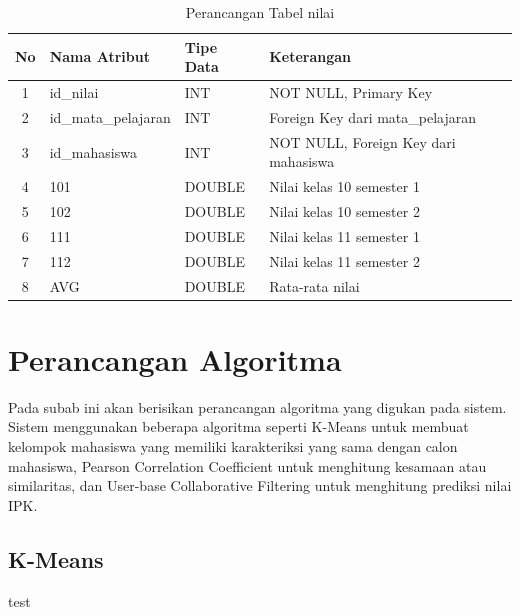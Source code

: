 \begin{enumerate}
        \begin{table}[H]
            \centering
            \begin{tabular}{|c|p{4cm}|p{4cm}|p{4cm}|}
                \hline
                No & Nama Atribut & Tipe Data & Keterangan \\
                \hline
                1 & id\_nilai & INT & NOT NULL, Primary Key \\
                \hline
                2 & id\_mata\_pelajaran & INT & Foreign Key dari mata\_pelajaran \\
                \hline
                3 & id\_mahasiswa & INT & NOT NULL, Foreign Key dari mahasiswa \\
                \hline
                4 & 101 & DOUBLE & Nilai kelas 10 semester 1 \\
                \hline
                5 & 102 & DOUBLE & Nilai kelas 10 semester 2 \\
                \hline
                6 & 111 & DOUBLE & Nilai kelas 11 semester 1 \\
                \hline
                7 & 112 & DOUBLE & Nilai kelas 11 semester 2 \\
                \hline
                8 & AVG & DOUBLE & Rata-rata nilai \\
                \hline
            \end{tabular}
            \caption{Perancangan Tabel nilai}
            \label{tab:perancangan tabel nilai}
        \end{table}
\end{enumerate}

\section{Perancangan Algoritma}
\label{sec:perancangan algoritma}

Pada subab ini akan berisikan perancangan algoritma yang digukan pada sistem. Sistem menggunakan beberapa algoritma seperti K-Means untuk membuat kelompok mahasiswa yang memiliki karakteriksi yang sama dengan calon mahasiswa, Pearson Correlation Coefficient untuk menghitung kesamaan atau similaritas, dan User-base Collaborative Filtering untuk menghitung prediksi nilai IPK.

\subsection{K-Means}

\begin{algorithm}
\caption{test}
\end{algorithm}

